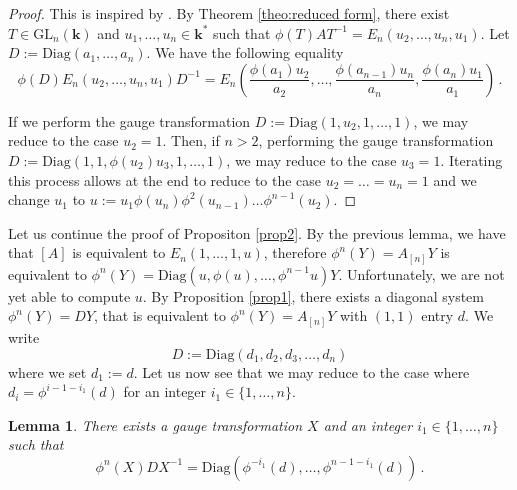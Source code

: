 \documentclass[a4paper,11pt]{amsart}
\newtheorem{lem}[thm]{Lemma}
\begin{document}
\begin{proof}
This is inspired by \cite[Section 4.2]{hendriks1998algorithm}. By Theorem \ref{theo:reduced form}, there exist $T\in \mathrm{GL}_n (\mathbf{k})$ and $u_1,\dots,  u_n \in \mathbf{k}^*$  such that 
$\phi(T)AT^{-1}=E_n(u_2,\ldots,u_n,u_1)$.
Let $D:=\mathrm{Diag}\left(a_1,\ldots,a_n\right)$.
We have the following equality 
$$
\phi(D)E_n(u_2,\ldots,u_n,u_1)D^{-1} = E_n\left(\frac{\phi(a_1) u_2}{a_2},\ldots,\frac{\phi(a_{n-1}) u_n}{a_n},\frac{\phi(a_n) u_1}{a_1}\right)\, .
$$


If we perform the gauge transformation $D:=\mathrm{Diag}(1,u_2,1,\ldots,1)$, we may reduce to the case $u_2=1$. Then,  if $n>2$,  performing the gauge transformation $D:=\mathrm{Diag}(1,1,\phi(u_2)u_3,1,\ldots,1)$, we may reduce to the case $u_3=1$. Iterating this process  allows at the end to reduce to the case $u_2= \dots=u_n=1$ and we change $u_1$ to $u:=u_1\phi(u_n)\phi^2(u_{n-1})\ldots\phi^{n-1}(u_2)$.
\end{proof}


Let us continue the proof of Propositon \ref{prop2}. 
By the previous lemma, we have that $[A]$ is equivalent to $E_n(1,\ldots,1,u)$, therefore $\phi^n(Y)=A_{[n]}Y$ is equivalent to $\phi^n(Y)=\mathrm{Diag}(u,\phi(u),\dots,  \phi^{n-1} u)Y$.  Unfortunately, we are not yet able to compute $u$.   By Proposition \ref{prop1},  there exists 
 a diagonal system  $\phi^n (Y)=DY$, that is  equivalent to $\phi^n (Y)=A_{[n]}Y$ with $(1,1)$ entry $d$. 
 We write 
$$
D:=\mathrm{Diag}(d_1,d_2,d_3,\ldots,d_n)
$$
where we set $d_1:=d$.  Let us now see that we may reduce to the case where $d_i=\phi^{i-1-i_1}(d)$ for an integer $i_1\in\lbrace 1,\ldots,n\rbrace$. 
\begin{lem}
There exists a  gauge transformation $X$ and an integer $i_1\in\lbrace 1,\ldots,n\rbrace$ such that 
\begin{equation}
\label{eq:findX}
   \phi^n(X)D X^{-1} = \mathrm{Diag}(\phi^{-i_1}(d),\ldots,\phi^{n-1-i_1}(d))\, . 
\end{equation}
\end{lem}
\end{document}

